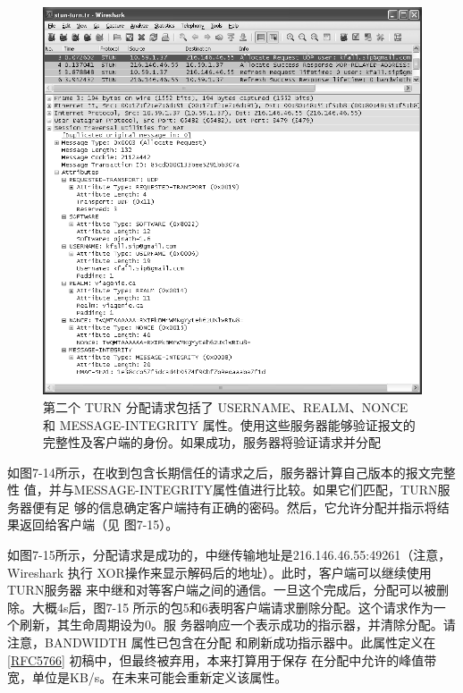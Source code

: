 \begin{figure}[H]
    \centering
	\includegraphics[scale=0.5]{imgs/7/7-14.png}
	\caption{第二个 TURN 分配请求包括了 USERNAME、REALM、NONCE 和 MESSAGE-INTEGRITY 属性。使用这些服务器能够验证报文的完整性及客户端的身份。如果成功，服务器将验证请求并分配}
\end{figure}

如图7-14所示，在收到包含长期信任的请求之后，服务器计算自己版本的报文完整性
值，并与MESSAGE-INTEGRITY属性值进行比较。如果它们匹配，TURN服务器便有足
够的信息确定客户端持有正确的密码。然后，它允许分配并指示将结果返回给客户端（见
图7-15）。

如图7-15所示，分配请求是成功的，中继传输地址是216.146.46.55:49261（注意，
Wireshark 执行 XOR操作来显示解码后的地址）。此时，客户端可以继续使用TURN服务器
来中继和对等客户端之间的通信。一旦这个完成后，分配可以被删除。大概4s后，图7-15
所示的包5和6表明客户端请求删除分配。这个请求作为一个刷新，其生命周期设为0。服
务器响应一个表示成功的指示器，并清除分配。请注意，BANDWIDTH 属性已包含在分配
和刷新成功指示器中。此属性定义在\href{https://www.rfc-editor.org/rfc/rfc5766}{[RFC5766]} 初稿中，但最终被弃用，本来打算用于保存
在分配中允许的峰值带宽，单位是KB/s。在未来可能会重新定义该属性。

